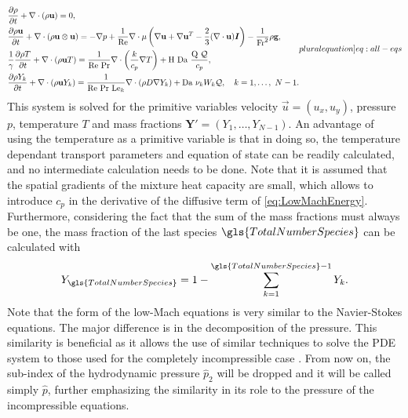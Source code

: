 \begin{subequations}
	\begin{align}
		 & \pfrac{\rho}{t} + \nabla \cdot (\rho \vec{u})   = 0, \label{eq:LowMach_Conti}                                                                                                                                                                                                   \\
		 & \pfrac{\rho \vec{u}}{t} + \nabla \cdot (\rho \vec{u} \otimes \vec{u})   = - \nabla p + \frac{1}{\Rey}\nabla \cdot \mu\left( \nabla \vec{u} +\nabla \vec{u}^T  - \frac{2}{3}(\nabla\cdot \vec{u})\mytensor{I} \right)  - \frac{1}{\Fr^2}\rho\vec{g}, \label{eq:LowMach_Momentum} \\
		 &\frac{1}{\gamma} \pfrac{\rho T}{t} + \nabla \cdot (\rho \vec{u} T)  = \frac{1}{\text{Re}~\text{Pr}}\nabla \cdot\left(\frac{k}{c_p} \nabla T\right)+ \text{H}~\Da~\frac{\heatRelease~\mathcal{Q}}{c_p}, \label{eq:LowMachEnergy}                                                                  \\
		 & \pfrac{\rho Y_k}{t} +	\nabla \cdot (\rho  \vec{u}Y_k)   = \frac{1}{\text{Re}~\text{Pr}~\text{Le}_k}\nabla \cdot(\rho D \nabla Y_k)+  \Da~\stoicCoef_k W_k \mathcal{Q}, \quad k = 1, \dots,~N - 1. \label{eq:LowMachMassBalance}
	\end{align}
	\label{eq:all-eq}\label[pluralequation]{eq:all-eqs}
\end{subequations}
This system is solved for the primitive variables velocity $\vec{u} = (u_x, u_y)$, pressure $p$, temperature $T$ and mass fractions ${\mathbf{Y}' = (Y_1,\dots,Y_{N-1})}$. An advantage of using the temperature as a primitive variable is that in doing so, the temperature dependant transport parameters and equation of state can be readily calculated, and no intermediate calculation needs to be done. Note that it is assumed that the spatial gradients of the mixture heat capacity are small, which allows to introduce $c_p$ in the derivative of the diffusive term of \cref{eq:LowMachEnergy}. Furthermore, considering the fact that the sum of the mass fractions must always be one, the mass fraction of the last species $\gls{TotalNumberSpecies}$ can be calculated with
\begin{align} \label{eq:MassFractionConstraint}
	Y_{\gls{TotalNumberSpecies}} = 1 - \sum_{k = 1}^{\gls{TotalNumberSpecies}-1}Y_k.
\end{align}
Note that the form of the low-Mach equations is very similar to the Navier-Stokes equations. The major difference is in the decomposition of the pressure. This similarity is beneficial as it allows the use of similar techniques to solve the \gls{PDE} system to those used for the completely incompressible case \parencite{keshtibanCompressibleFlowSolvers2003}. From now on, the sub-index of the hydrodynamic pressure $\hat p_2$ will be dropped and it will be called simply $\hat p$, further emphasizing the similarity in its role to the pressure of the incompressible equations.

